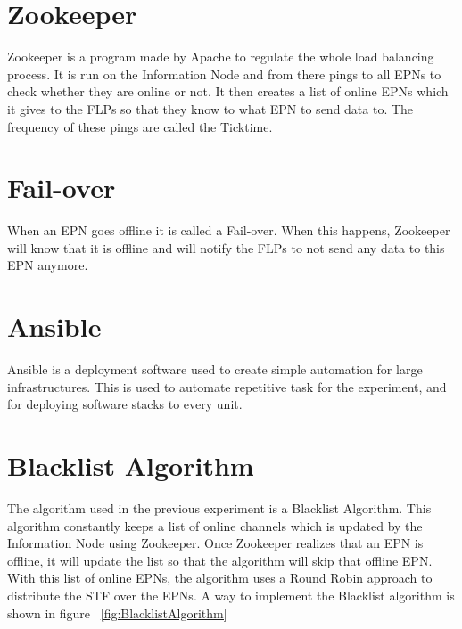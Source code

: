 \section{Zookeeper}
Zookeeper is a program made by Apache to regulate the whole load balancing process. It is run on the Information Node and from there pings to all EPNs to check whether they are online or not. It then creates a list of online EPNs which it gives to the FLPs so that they know to what EPN to send data to. The frequency of these pings are called the Ticktime. 

\section{Fail-over}
When an EPN goes offline it is called a Fail-over. When this happens, Zookeeper will know that it is offline and will notify the FLPs to not send any data to this EPN anymore. 

\section{Ansible}
Ansible is a deployment software used to create simple automation for large infrastructures. This is used to automate repetitive task for the experiment, and for deploying software stacks to every unit. 

\section{Blacklist Algorithm}
The algorithm used in the previous experiment is a Blacklist Algorithm. This algorithm constantly keeps a list of online channels which is updated by the Information Node using Zookeeper. Once Zookeeper realizes that an EPN is offline, it will update the list so that the algorithm will skip that offline EPN. With this list of online EPNs, the algorithm uses a Round Robin approach to distribute the STF over the EPNs. A way to implement the Blacklist algorithm is shown in figure ~\ref{fig:BlacklistAlgorithm}

